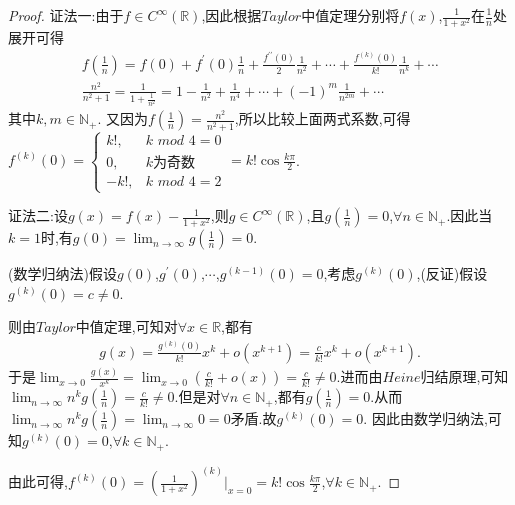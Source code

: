 \documentclass[lang=cn,newtx,10pt,scheme=chinese]{elegantbook}
\begin{document}
\begin{proof}
    {\color{blue}证法一:}由于\(f\in C^{\infty}(\mathbb{R})\),因此根据\(Taylor\)中值定理分别将\(f(x)\),\(\frac{1}{1 + x^2}\)在\(\frac{1}{n}\)处展开可得
\begin{gather*}
    f(\frac{1}{n}) = f(0) + f^{\prime}(0)\frac{1}{n} + \frac{f^{\prime\prime}(0)}{2}\frac{1}{n^2} + \cdots + \frac{f^{(k)}(0)}{k!}\frac{1}{n^k} + \cdots
    \\
    \frac{n^2}{n^2+1}=\frac{1}{1 + \frac{1}{n^2}} = 1 - \frac{1}{n^2} + \frac{1}{n^4} + \cdots + (-1)^m\frac{1}{n^{2m}} + \cdots
\end{gather*}
    其中\(k,m\in \mathbb{N}_+\).
    又因为$f\left( \frac{1}{n} \right) =\frac{n^2}{n^2+1}$,所以比较上面两式系数,可得\(f^{(k)}(0) = \begin{cases}
    k!, & k\,\,mod\,\,4 = 0\\
    0, & k\text{为奇数}\\
    -k!, & k\,\,mod\,\,4 = 2
    \end{cases} = k!\cos\frac{k\pi}{2}\).

    {\color{blue}证法二:}设\(g(x) = f(x) - \frac{1}{1 + x^2}\),则\(g\in C^{\infty}(\mathbb{R})\),且\(g(\frac{1}{n}) = 0\),\(\forall n\in \mathbb{N}_+\).因此当\(k = 1\)时,有\(g(0) = \lim_{n\rightarrow \infty}g(\frac{1}{n}) = 0\).

(数学归纳法)假设\(g(0)\),\(g^{\prime}(0)\),\(\cdots\),\(g^{(k - 1)}(0) = 0\),考虑\(g^{(k)}(0)\),(反证)假设\(g^{(k)}(0) = c\neq 0\).

则由\(Taylor\)中值定理,可知对\(\forall x\in \mathbb{R}\),都有
\begin{align*}
   g(x) = \frac{g^{(k)}(0)}{k!}x^k + o(x^{k + 1}) = \frac{c}{k!}x^k + o(x^{k + 1}).
\end{align*}
于是\(\lim_{x\rightarrow 0}\frac{g(x)}{x^k} = \lim_{x\rightarrow 0}(\frac{c}{k!} + o(x)) = \frac{c}{k!} \neq 0\).进而由\(Heine\)归结原理,可知\(\lim_{n\rightarrow \infty}n^kg(\frac{1}{n}) = \frac{c}{k!} \neq 0\).但是对\(\forall n\in \mathbb{N}_+\),都有\(g(\frac{1}{n}) = 0\).从而\(\lim_{n\rightarrow \infty}n^kg(\frac{1}{n}) = \lim_{n\rightarrow \infty}0 = 0\)矛盾.故\(g^{(k)}(0) = 0\).
因此由数学归纳法,可知\(g^{(k)}(0) = 0\),\(\forall k\in \mathbb{N}_+\).

由此可得,\(f^{(k)}(0) = (\frac{1}{1 + x^2})^{(k)}\Big|_{x = 0} = k!\cos\frac{k\pi}{2}\),\(\forall k\in \mathbb{N}_+\).
\end{proof}
\end{document}
